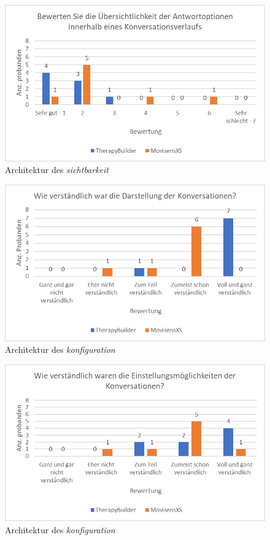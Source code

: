 \begin{figure}[h]
\centering
\includegraphics[width=1\textwidth]{pictures/diagramme/antwortoptkonv}
\caption{Architektur des \emph{sichtbarkeit}}
\label{antwortoptkonv}
\end{figure}

\begin{figure}[h]
\centering
\includegraphics[width=1\textwidth]{pictures/diagramme/konversationdarstellung}
\caption{Architektur des \emph{konfiguration}}
\label{konversationdarstellung}
\end{figure}

\begin{figure}[h]
\centering
\includegraphics[width=1\textwidth]{pictures/diagramme/konversationeinstellung}
\caption{Architektur des \emph{konfiguration}}
\label{konversationeinstellung}
\end{figure}



